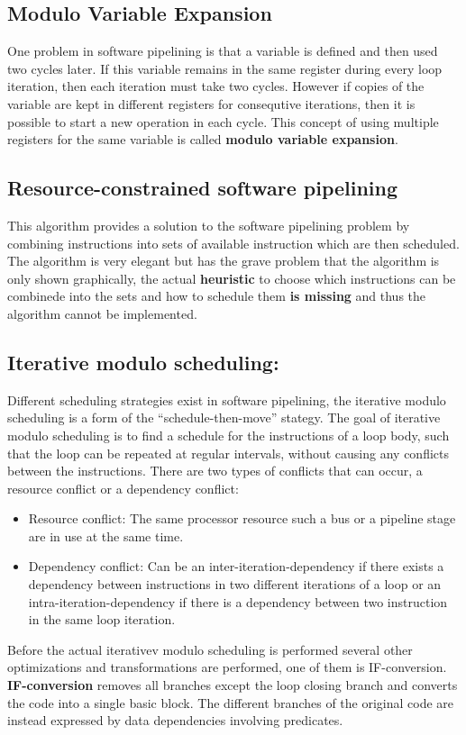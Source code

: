 \documentclass[a4paper,10pt]{article}
\begin{document}
\subsection{Modulo Variable Expansion}
One problem in software pipelining is that a variable is defined and then used two cycles later. If 
this variable remains in the same register during every loop iteration, then each iteration must take two cycles. However if copies of 
the variable are kept in different registers for consequtive iterations, then it is possible to start a new operation in each cycle.
This concept of using multiple registers for the same variable is called \textbf{modulo variable expansion}.


\subsection{Resource-constrained software pipelining}
This algorithm provides a solution to the software pipelining problem by combining instructions into sets of available instruction which 
are then scheduled. The algorithm is very elegant but has the grave problem that the algorithm is only shown graphically, the actual
\textbf{heuristic} to choose which instructions can be combinede into the sets and how to schedule them \textbf{is missing} and thus the 
algorithm cannot be implemented.

\subsection{Iterative modulo scheduling:}
Different scheduling strategies exist in software pipelining, the iterative modulo scheduling is a form of the ``schedule-then-move''
stategy. The goal of iterative modulo scheduling is to find a schedule for the instructions of a loop body, such that the loop
can be repeated at regular intervals, without causing any conflicts between the instructions. There are two types of conflicts that can
occur, a resource conflict or a dependency conflict:
\begin{itemize}
 \item Resource conflict: The same processor resource such a bus or a pipeline stage are in use at the same time.
 \item Dependency conflict: Can be an inter-iteration-dependency if there exists a dependency between instructions in two different 
       iterations of a loop or an intra-iteration-dependency if there is a dependency between two instruction in the same loop iteration.
\end{itemize}
Before the actual iterativev modulo scheduling is performed several other optimizations and transformations are performed, one of them is
IF-conversion. \textbf{IF-conversion} removes all branches except the loop closing branch and converts the code into a single basic block. The different branches of the original code are instead expressed by data dependencies involving predicates.
\end{document}
